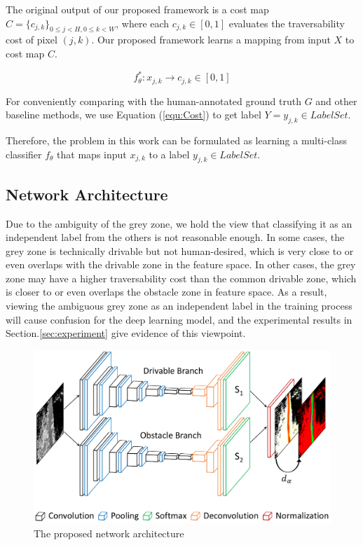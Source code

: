 \documentclass[letterpaper, 10 pt, conference]{ieeeconf}  %
\begin{document}
The original output of our proposed framework is a cost map $C=\{c_{j,k}\}_{0\le j<H,0\le k<W}$, where each $c_{j,k}\in [0,1]$ evaluates the traversability cost of pixel $(j,k)$. Our proposed framework learns a mapping from input $X$ to cost map $C$.

\vspace{-2mm}
\begin{equation}
f_\theta^*:x_{j,k}\rightarrow c_{j,k} \in [0,1]
\end{equation}

For conveniently comparing with the human-annotated ground truth $G$ and other baseline methods, we use Equation (\ref{equ:Cost}) to get label $Y=y_{j,k}\in LabelSet$.



Therefore, the problem in this work can be formulated as learning a multi-class classifier $f_\theta$ that maps input $x_{j,k}$ to a label $y_{j,k}\in LabelSet$.

\subsection{Network Architecture}
Due to the ambiguity of the grey zone, we hold the view that classifying it as an independent label from the others is not reasonable enough. In some cases, the grey zone is technically drivable but not human-desired, which is very close to or even overlaps with the drivable zone in the feature space. In other cases, the grey zone may have a higher traversability cost than the common drivable zone, which is closer to or even overlaps the obstacle zone in feature space. As a result, viewing the ambiguous grey zone as an independent label in the training process will cause confusion for the deep learning model, and the experimental results in Section.\ref{sec:experiment} give evidence of this viewpoint.

\begin{figure}[b]
	\vspace{-2mm}
	\centering
	\includegraphics[scale=0.22]{network.pdf}
	\caption{The proposed network architecture}
	\label{fig:network}
\end{figure}
\end{document}
